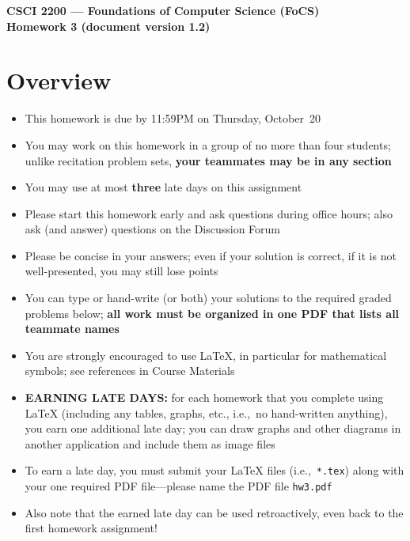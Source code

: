 \documentclass[11pt]{article}
\begin{document}
\thispagestyle{empty}   %

\begin{center}
\large
\textbf{CSCI 2200 --- Foundations of Computer Science (FoCS) \\
Homework 3 (document version 1.2)}
\end{center}

\section*{Overview}
\begin{itemize}
\item This homework is due by 11:59PM on Thursday, October~20
\item You may work on this homework in a group of no more than four students;
  unlike recitation problem sets,
  \textbf{your teammates may be in any section}
\item You may use at most \textbf{three} late days on this assignment
\item Please start this homework early and ask questions during
  office hours; %
  also ask (and answer) questions on the Discussion Forum 
\item Please be concise in your answers;
  even if your solution is correct, if it is not well-presented,
  you may still lose points
\item You can type or hand-write (or both) your solutions
  to the required graded problems below;
  \textbf{all work must be organized in one PDF that lists
  all teammate names}
\item You are strongly encouraged to use LaTeX, in particular for
  mathematical symbols;
  see references in Course Materials
\item \textbf{EARNING LATE DAYS:}
  for each homework that you complete using LaTeX
  (including any tables, graphs, etc., i.e.,~no hand-written anything),
  you earn one additional late day;
  you can draw graphs and other diagrams
  in another application and include them as image files
\item To earn a late day, you must submit your LaTeX files
  (i.e.,~\verb+*.tex+) along with your one required PDF file---please name
  the PDF file \verb+hw3.pdf+
\item Also note that the earned late day can be used
  retroactively, even back to the first homework assignment!
\end{itemize}
\end{document}
